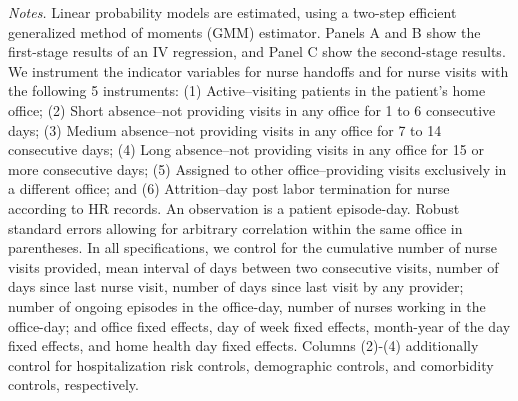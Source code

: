 \documentclass[final,12pt, notitlepage]{article}
\begin{document}
\begin{singlespace}
\begin{table}[H]
\begin{threeparttable}
{\begin{tabular*}{\textwidth}{l@{\extracolsep{\fill}}*{4}{c}}
\bottomrule
\end{tabular*}
}
	\begin{tablenotes}
	\scriptsize
	\item \emph{Notes.}  Linear probability models are estimated, using a two-step efficient generalized method of moments (GMM) estimator.
	Panels A and B show the first-stage results of an IV regression, and Panel C show the second-stage results.
	We instrument the indicator variables for nurse handoffs and for nurse visits with the following 5 instruments:
(1) Active--visiting patients in the patient's home office;
(2) Short absence--not providing visits in any office for 1 to 6 consecutive days;
(3) Medium absence--not providing visits in any office for 7 to 14 consecutive days;
(4) Long absence--not providing visits in any office for 15 or more consecutive days;
(5) Assigned to other office--providing visits exclusively in a different office; and
(6) Attrition--day post labor termination for nurse according to HR records.
	An observation is a patient episode-day.
	Robust standard errors allowing for arbitrary correlation within the same office in parentheses.
		In all specifications, we control for the cumulative number of nurse visits provided, mean interval of days between two consecutive visits, number of days since last nurse visit, number of days since last visit by any provider; number of ongoing episodes in the office-day, number of nurses working in the office-day; and office fixed effects, day of week fixed effects, month-year of the day fixed effects, and home health day fixed effects.
	Columns (2)-(4) additionally control for hospitalization risk controls, demographic controls, and comorbidity controls, respectively.

\end{tablenotes}
\end{threeparttable}
\end{table}
\end{singlespace}
\end{document}

